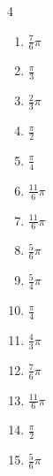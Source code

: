 \begin{multicols}{4}
\begin{enumerate}
  \item $\displaystyle \frac{7}{6}\pi$

\columnbreak %

\resetques

  \item $\displaystyle \frac{\pi}{3}$

  \item $\displaystyle \frac{2}{3}\pi$

  \item $\displaystyle \frac{\pi}{2}$

  \item $\displaystyle \frac{\pi}{4}$

  \item $\displaystyle \frac{11}{6}\pi$

  \item $\displaystyle \frac{11}{6}\pi$

  \item $\displaystyle \frac{5}{6}\pi$

  \item $\displaystyle \frac{5}{4}\pi$

  \item $\displaystyle \frac{\pi}{4}$

  \item $\displaystyle \frac{4}{3}\pi$

  \item $\displaystyle \frac{7}{6}\pi$

  \item $\displaystyle \frac{11}{6}\pi$

  \item $\displaystyle \frac{\pi}{2}$

  \item $\displaystyle \frac{5}{6}\pi$


\end{enumerate}
\end{multicols}
